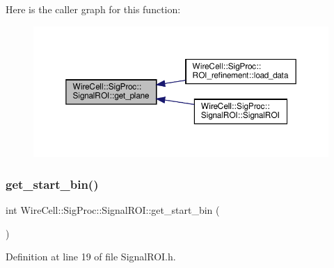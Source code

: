 Here is the caller graph for this function\+:
\nopagebreak
\begin{figure}[H]
\begin{center}
\leavevmode
\includegraphics[width=350pt]{class_wire_cell_1_1_sig_proc_1_1_signal_r_o_i_ab3dee5cfbcf601f4ac56bc7968c74fda_icgraph}
\end{center}
\end{figure}
\mbox{\label{class_wire_cell_1_1_sig_proc_1_1_signal_r_o_i_acfe33b6d693694e95f905a34a2940c32}} 
\subsubsection{\texorpdfstring{get\+\_\+start\+\_\+bin()}{get\_start\_bin()}}
{\footnotesize\ttfamily int Wire\+Cell\+::\+Sig\+Proc\+::\+Signal\+R\+O\+I\+::get\+\_\+start\+\_\+bin (\begin{DoxyParamCaption}{ }\end{DoxyParamCaption})\hspace{0.3cm}{\ttfamily [inline]}}



Definition at line 19 of file Signal\+R\+O\+I.\+h.

